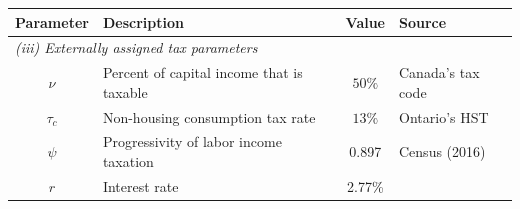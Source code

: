\begin{table}[p]
\footnotesize
\renewcommand{\arraystretch}{1.2}
\begin{center}
\begin{tabular}{clcl}\toprule
Parameter & Description & Value & Source\\
\midrule
\multicolumn{4}{l}{\textit{(iii) Externally assigned tax parameters}}\\
\midrule
$\nu$ & Percent of capital income that is taxable & $50\%$ & Canada's tax code \\
$\tau_{c}$ & Non-housing consumption tax rate & $13\%$ & Ontario's HST \\
$\psi$ & Progressivity of labor income taxation & 0.897 & Census (2016) \\
$r$ & Interest rate & 2.77\% & \citet{bruneau-etal-2018} \\
\bottomrule
\bottomrule
\end{tabular}
\end{center}
\normalsize
\end{table}
